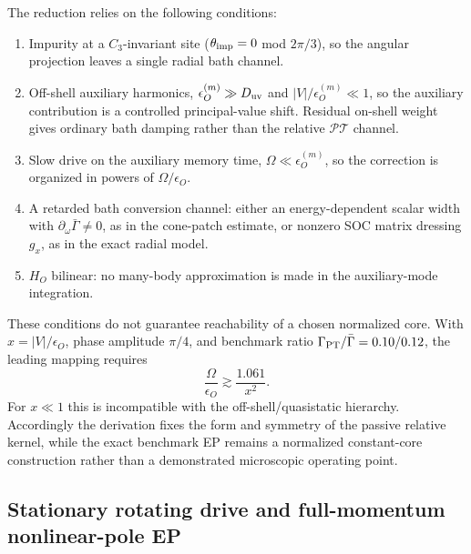 \documentclass[%
  aps,prb,reprint,amsmath,amssymb,superscriptaddress,longbibliography,floatfix
]{revtex4-2}
\newcommand{\PT}{\mathcal{PT}}
\begin{document}
The reduction relies on the following conditions:
\begin{enumerate}[label=(\roman*)]
\item Impurity at a $C_3$-invariant site ($\theta_{\rm imp}=0$
  mod $2\pi/3$), so the angular projection leaves a single radial
  bath channel.
\item Off-shell auxiliary harmonics, $\epsilon_O^{(m)}\gg D_{\rm uv}$ and
$|V|/\epsilon_O^{(m)}\ll1$, so the
  auxiliary contribution is a controlled principal-value shift.  Residual
  on-shell weight gives ordinary bath damping rather than the relative
  $\PT$ channel.
\item Slow drive on the auxiliary memory time, $\Omega\ll\epsilon_O^{(m)}$,
  so the correction is organized in powers of $\Omega/\epsilon_O$.
\item A retarded bath conversion channel: either an energy-dependent scalar
  width with $\partial_\omega\bar\Gamma\neq0$, as in the cone-patch estimate,
  or nonzero SOC matrix dressing $g_x$, as in the exact radial model.
\item $H_O$ bilinear: no many-body approximation is made in the
  auxiliary-mode integration.
\end{enumerate}

These conditions do not guarantee reachability of a chosen normalized core.
With $x=|V|/\epsilon_O$, phase amplitude $\pi/4$, and benchmark ratio
$\Gamma_{\rm PT}/\bar\Gamma=0.10/0.12$, the leading mapping requires
\begin{equation}
\frac{\Omega}{\epsilon_O}\gtrsim\frac{1.061}{x^2}.
\label{eq:app_reachability_bound}
\end{equation}
For $x\ll1$ this is incompatible with the off-shell/quasistatic hierarchy.
Accordingly the derivation fixes the form and symmetry of the passive
relative kernel, while the exact benchmark EP remains a normalized
constant-core construction rather than a demonstrated microscopic operating
point.

\subsection{Stationary rotating drive and full-momentum nonlinear-pole EP}
\label{app:full_k_causal_ep}
\end{document}

